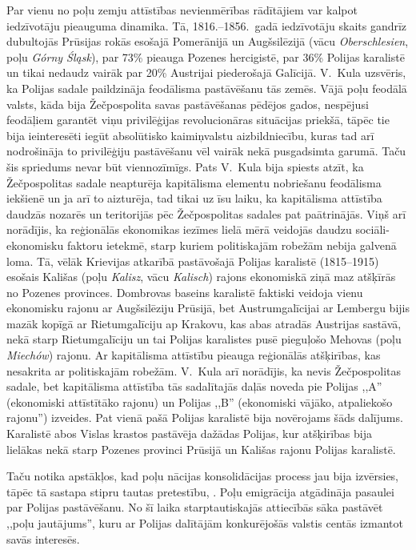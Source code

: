 \documentclass[twoside,a5paper,12pt,fleqn,openany]{extbook}
\newcommand{\asterism}{\vspace{1em}{\centering\Large\bfseries$\ast~\ast~\ast$\par}\vspace{1em}}
\newcommand{\pltxti}[1]{\textit{\textpolish{#1}}}
\newcommand{\detxti}[1]{\textit{\textgerman{#1}}}
\begin{document}
Par vienu no poļu zemju attīstības nevienmērības rādītājiem var kalpot iedzīvotāju pieauguma dinamika. Tā, 1816.--1856.~gadā iedzīvotāju skaits gandrīz dubultojās Prūsijas rokās esošajā Pomerānijā un Augšsilēzijā (vācu \detxti{Oberschlesien}, poļu \pltxti{Górny Śląsk}), par 73\% pieauga Pozenes hercigistē, par 36\% Polijas karalistē un tikai nedaudz vairāk par 20\% Austrijai piederošajā Galīcijā. V.~Kula uzsvēris, ka Polijas sadale paildzināja feodālisma pastāvēšanu tās zemēs. Vājā poļu feodālā valsts, kāda bija Žečpospolita savas pastāvēšanas pēdējos gados, nespējusi feodāļiem garantēt viņu privilēģijas revolucionāras situācijas priekšā, tāpēc tie bija ieinteresēti iegūt absolūtisko kaimiņvalstu aizbildniecību, kuras tad arī nodrošināja to privilēģiju pastāvēšanu vēl vairāk nekā pusgadsimta garumā. Taču šis spriedums nevar būt viennozīmīgs. Pats V.~Kula bija spiests atzīt, ka Žečpospolitas sadale neapturēja kapitālisma elementu nobriešanu feodālisma iekšienē un ja arī to aizturēja, tad tikai uz īsu laiku, ka kapitālisma attīstība daudzās nozarēs un teritorijās pēc Žečpospolitas sadales pat paātrinājās. Viņš arī norādījis, ka reģionālās ekonomikas iezīmes lielā mērā veidojās daudzu sociāli-ekonomisku faktoru ietekmē, starp kuriem politiskajām robežām nebija galvenā loma. Tā, vēlāk Krievijas atkarībā pastāvošajā Polijas karalistē (1815--1915) esošais Kališas (poļu \pltxti{Kalisz}, vācu \detxti{Kalisch}) rajons ekonomiskā ziņā maz atšķīrās no Pozenes provinces. Dombrovas baseins karalistē faktiski veidoja vienu ekonomisku rajonu ar Augšsilēziju Prūsijā, bet Austrumgalīcijai ar Lembergu bijis mazāk kopīgā ar Rietumgalīciju ap Krakovu, kas abas atradās Austrijas sastāvā, nekā starp Rietumgalīciju un tai Polijas karalistes pusē pieguļošo Mehovas (poļu \pltxti{Miechów}) rajonu. Ar kapitālisma attīstību pieauga reģionālās atšķirības, kas nesakrita ar politiskajām robežām. V.~Kula arī norādījis, ka nevis Žečpospolitas sadale, bet kapitālisma attīstība tās sadalītajās daļās noveda pie Polijas ,,A'' (ekonomiski attīstītāko rajonu) un Polijas ,,B'' (ekonomiski vājāko, atpaliekošo rajonu'') izveides. Pat vienā pašā Polijas karalistē bija novērojams šāds dalījums. Karalistē abos Vislas krastos pastāvēja dažādas Polijas, kur atšķirības bija lielākas nekā starp Pozenes provinci Prūsijā un Kališas rajonu Polijas karalistē.

\asterism


Taču  notika apstākļos, kad poļu nācijas konsolidācijas process jau bija izvērsies, tāpēc tā sastapa stipru tautas pretestību, . Poļu emigrācija atgādināja pasaulei par Polijas pastāvēšanu. No šī laika starptautiskajās attiecībās sāka pastāvēt ,,poļu jautājums'', kuru ar Polijas dalītājām konkurējošās valstis centās izmantot savās interesēs.
\end{document}
